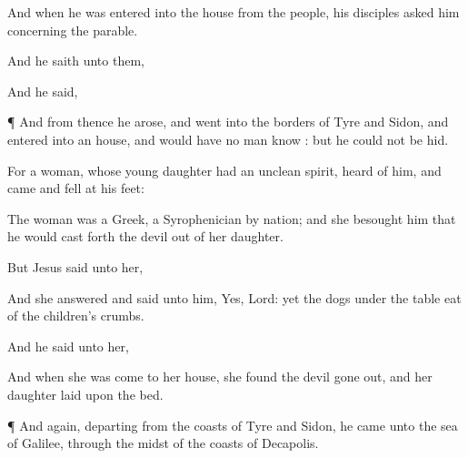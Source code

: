 {

And
when he was
entered
into the
house
from the
people,
his
disciples
asked
him
concerning the
parable.

And he
saith unto
them,
{}


And he
said,
{}





\par }{\PP {}¶
And from
thence he
arose, and
went
into the
borders of
Tyre
and
Sidon,
and
entered
into an
house, and would
have no
man
know
{}:
but he
could
not be
hid.

For
a
{}
woman,
whose young
daughter
had
an
unclean
spirit,
heard
of
him, and
came and
fell
at
his
feet:

The
woman
was a
Greek, a
Syrophenician by
nation;
and she
besought
him
that he would cast
forth the
devil
out
of
her
daughter.

But
Jesus
said unto
her,
{}

And she
answered
and
said unto
him,
Yes,
Lord:
yet the
dogs
under the
table
eat
of the
children’s
crumbs.

And he
said unto
her,
{}

And when she was
come
to
her
house, she
found the
devil gone
out,
and her
daughter
laid
upon the
bed.


\par }{\PP {}¶
And
again,
departing
from the
coasts of
Tyre
and
Sidon, he
came
unto the
sea of
Galilee,
through the
midst of the
coasts of
Decapolis.

}
